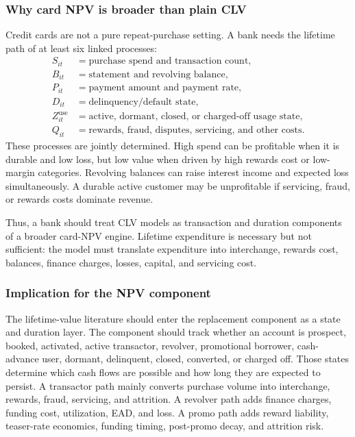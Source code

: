 \documentclass[11pt]{article}
\newcommand{\1}{\mathbf{1}}
\begin{document}
\subsubsection{Why card NPV is broader than plain CLV}

Credit cards are not a pure repeat-purchase setting. A bank needs the lifetime
path of at least six linked processes:
\begin{align}
  S_{it} &= \text{purchase spend and transaction count}, \\
  B_{it} &= \text{statement and revolving balance}, \\
  P_{it} &= \text{payment amount and payment rate}, \\
  D_{it} &= \text{delinquency/default state}, \\
  Z^{\mathrm{use}}_{it} &= \text{active, dormant, closed, or charged-off usage state}, \\
  Q_{it} &= \text{rewards, fraud, disputes, servicing, and other costs}.
\end{align}
These processes are jointly determined. High spend can be profitable when it is
durable and low loss, but low value when driven by high rewards cost or
low-margin categories. Revolving balances can raise interest income and
expected loss simultaneously. A durable active customer may be unprofitable if
servicing, fraud, or rewards costs dominate revenue.

Thus, a bank should treat CLV models as transaction and duration components of
a broader card-NPV engine. Lifetime expenditure is necessary but not sufficient:
the model must translate expenditure into interchange, rewards cost, balances,
finance charges, losses, capital, and servicing cost.

\subsubsection{Implication for the NPV component}
\label{subsec:ltv-component-implication}

The lifetime-value literature should enter the replacement component as a
state and duration layer. The component should track whether an account is
prospect, booked, activated, active transactor, revolver, promotional borrower,
cash-advance user, dormant, delinquent, closed, converted, or charged off.
Those states determine which cash flows are possible and how long they are
expected to persist. A transactor path mainly converts purchase volume into
interchange, rewards, fraud, servicing, and attrition. A revolver path adds
finance charges, funding cost, utilization, EAD, and loss. A promo path adds
reward liability, teaser-rate economics, funding timing, post-promo decay, and
attrition risk.
\end{document}
